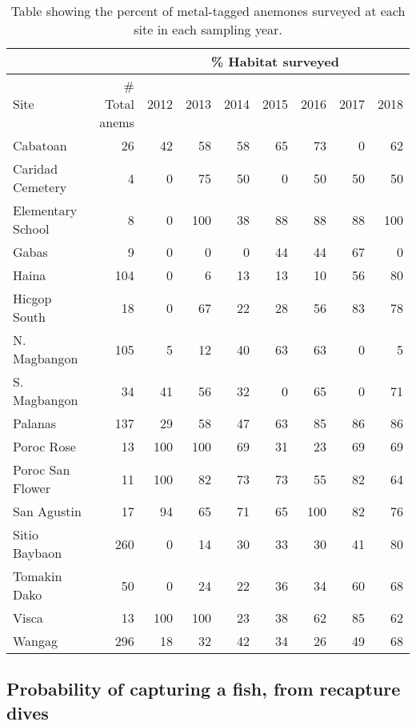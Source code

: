 \documentclass[12pt, oneside]{article}   	%
\begin{document}
\begin{table}
\begin{centering}
\begin{tabular}{|l|r|r|r|r|r|r|r|r|}
\hline 
\multicolumn{2}{|c|}{} & \multicolumn{7}{|c|}{\% Habitat surveyed} \\ \hline
Site & \# Total anems & 2012 & 2013 & 2014 & 2015 & 2016 & 2017 & 2018 \\ \hline
Cabatoan & 26 & 42 & 58 & 58 & 65 & 73 & 0 & 62 \\ \hline
Caridad Cemetery & 4 & 0 & 75 & 50 & 0 & 50 & 50 & 50 \\ \hline
Elementary School & 8 & 0 & 100 & 38 & 88 & 88 & 88 & 100 \\ \hline
Gabas & 9 & 0 & 0 & 0 & 44 & 44 & 67 & 0 \\ \hline
Haina & 104 & 0 & 6 & 13 & 13 & 10 & 56 & 80 \\ \hline
Hicgop South & 18 & 0 & 67 & 22 & 28 & 56 & 83 & 78 \\ \hline
N. Magbangon & 105 & 5 & 12 & 40 & 63 & 63 & 0 & 5 \\ \hline
S. Magbangon & 34 & 41 & 56 & 32 & 0 & 65 & 0 & 71 \\ \hline
Palanas & 137 & 29 & 58 & 47 & 63 & 85 & 86 & 86 \\ \hline
Poroc Rose & 13 & 100 & 100 & 69 & 31 & 23 & 69 & 69 \\ \hline
Poroc San Flower & 11 & 100 & 82 & 73 & 73 & 55 & 82 & 64 \\ \hline
San Agustin & 17 & 94 & 65 & 71 & 65 & 100 & 82 & 76 \\ \hline
Sitio Baybaon & 260 & 0 & 14 & 30 & 33 & 30 & 41 & 80 \\ \hline
Tomakin Dako & 50 & 0 & 24 & 22 & 36 & 34 & 60 & 68 \\ \hline
Visca & 13 & 100 & 100 & 23 & 38 & 62 & 85 & 62 \\ \hline
Wangag & 296 & 18 & 32 & 42 & 34 & 26 & 49 & 68 \\ \hline
\end{tabular}
\end{centering}
\caption{Table showing the percent of metal-tagged anemones surveyed at each site in each sampling year.}\label{APP_TAB_PercHabSampled}
\end{table}

\newpage{}

\subsection{Probability of capturing a fish, from recapture dives} \label{APP_SEC_ProbR}
\end{document}
